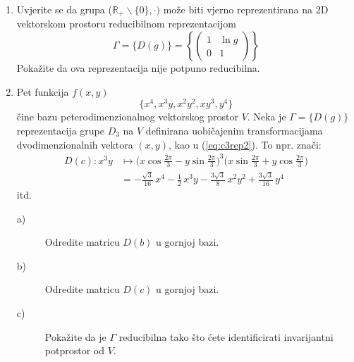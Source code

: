\begin{enumerate}[label=\arabic{chapter}.\arabic*.]
\item \label{zad:lnred} Uvjerite se da grupa ($\mathbb{R}_{+}\backslash \{0\}, \cdot )$
može biti vjerno reprezentirana na 2D vektorskom prostoru reducibilnom
reprezentacijom
\begin{equation*}
\Gamma = \{ D(g) \} = \left\{
\begin{pmatrix}
1 & \ln g  \\
0 & 1
\end{pmatrix}\right\}
\end{equation*}
Pokažite da ova reprezentacija nije potpuno reducibilna.

\item
Pet funkcija $f(x,y)$
\[
    \{x^4, x^3y, x^2y^2, xy^3, y^4\}
\]
čine bazu peterodimenzionalnog vektorskog prostor $V$. Neka je $\Gamma=
\{D(g)\}$ 
reprezentacija grupe $D_3$ na $V$ definirana uobičajenim transformacijama
dvodimenzionalnih vektora $(x,y)$, kao u (\ref{eq:c3rep2}). To npr. znači:
\begin{align*}
   D(c): x^3y &\mapsto \bigg(x\cos\frac{2\pi}{3}-y\sin\frac{2\pi}{3}\bigg)^3
\bigg(x\sin\frac{2\pi}{3}+y\cos\frac{2\pi}{3}\bigg) \\
 &= -\frac{\sqrt{3}}{16} \,  x^{4}  - \frac{1}{2} \, x^{3} y
   - \frac{3\sqrt{3}}{8} \,  x^{2} y^{2} + \frac{3\sqrt{3}}{16} \,  y^{4}
\end{align*}
itd. 
\begin{description}
\item[a)] Odredite matricu $D(b)$ u gornjoj bazi.
\item[b)] Odredite matricu $D(c)$ u gornjoj bazi.
\item[c)] Pokažite da je $\Gamma$ reducibilna tako što ćete identificirati
invarijantni potprostor od $V$.
\end{description}


\end{enumerate}
